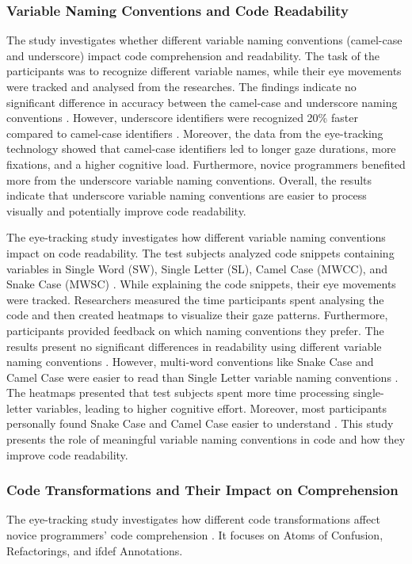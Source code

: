\subsubsection{Variable Naming Conventions and Code Readability}

The study \citet{sharif2010eye}investigates whether different variable naming conventions (camel-case and underscore) impact code comprehension and readability.
The task of the participants was to recognize different variable names, while their eye movements were tracked and analysed from the researches. 
The findings indicate no significant difference in accuracy between the camel-case and underscore naming conventions \citet{sharif2010eye}. However, underscore identifiers were recognized 20\% faster compared to camel-case identifiers \citet{sharif2010eye}. Moreover, the data from the eye-tracking technology showed that camel-case identifiers led to longer gaze durations, more fixations, and a   higher cognitive load. Furthermore, novice programmers benefited more from the underscore variable naming conventions.   
Overall, the results indicate that underscore variable naming conventions are easier to process visually and potentially improve code readability.   


The eye-tracking study \citet{broberg2019using}investigates how different variable naming conventions impact on code readability.  
The test subjects analyzed code snippets containing variables in Single Word (SW), Single Letter (SL), Camel Case (MWCC), and Snake Case (MWSC) \citet{broberg2019using}. While explaining the code snippets, their eye movements were tracked. Researchers measured the time participants spent analysing the code and then created heatmaps to visualize their gaze patterns. Furthermore, participants provided feedback on which naming conventions they prefer. The results present no significant differences in readability using different variable naming conventions \citet{broberg2019using}. However, multi-word conventions like Snake Case and Camel Case were easier to read than Single Letter variable naming conventions \citet{broberg2019using}. The heatmaps presented that test subjects spent more time processing single-letter variables, leading to higher cognitive effort. Moreover, most participants personally found Snake Case and Camel Case easier to understand \citet{broberg2019using}. 
This study presents the role of meaningful variable naming conventions in code and how they improve code readability.   

\subsubsection{Code Transformations and Their Impact on Comprehension}
The eye-tracking study \citet{silva2023evaluating} investigates how different code transformations affect novice programmers’ code comprehension \citet{silva2023evaluating}. It focuses on Atoms of Confusion, Refactorings, and ifdef Annotations.

